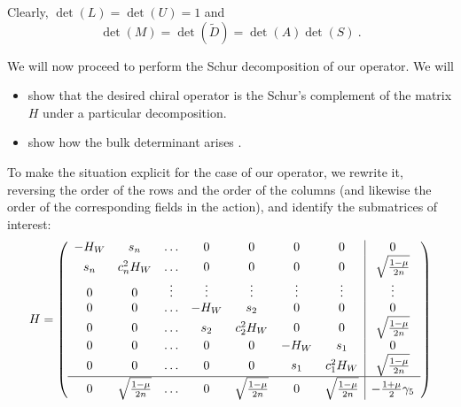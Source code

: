 \documentclass[12pt]{article}
\begin{document}
Clearly, $\det(L)=\det(U)=1$ and  
\begin{equation}
\det(M) = \det(\tilde{D}) = \det(A) \det(S) \ .
\end{equation}

We will now proceed to perform the Schur decomposition of our operator. We will
\begin{itemize}
\item
  show that the desired chiral operator is the Schur's complement of the matrix $H$ under a particular decomposition.
\item
  show how the bulk determinant arises .
\end{itemize}

To make the situation explicit for the case of our operator, we rewrite it, reversing the order of the rows and the order of the columns (and likewise the order of the corresponding fields in the action), and identify the submatrices of interest:
\begin{equation}
H = 
\left( \begin{array}{ccccccc|c} 
-H_W & s_n &       \ldots & 0 & 0 & 0& 0 & 0 \\
s_n  & c_n^2 H_W & \ldots & 0 & 0 & 0& 0 & \sqrt{ \frac{1-\mu}{2n} } \\
 0   &   0       & \vdots & \vdots & \vdots & \vdots & \vdots & \vdots \\
 0   &   0       & \ldots &  -H_W  &  s_2   &   0    &    0   &   0    \\
 0   &   0       & \ldots & s_2  & c_2^2 H_W &  0    &    0   &  \sqrt{ \frac{1-\mu}{2n} } \\
 0   &   0       & \ldots &    0   &    0    &  -H_W &  s_1   &    0   \\
 0   &   0       & \ldots &    0   &    0    &  s_1  & c_1^2 H_W &  \sqrt{ \frac{1-\mu}{2n} } \\ 
\hline 0   &  \sqrt{ \frac{1-\mu}{2n} } &  \ldots & 0 &  \sqrt{ \frac{1-\mu}{2n} } & 0 &  \sqrt{ \frac{1-\mu}{2n} } & -\frac{1+\mu}{2} \gamma_5 
\end{array} \right)
\end{equation}
\end{document}
